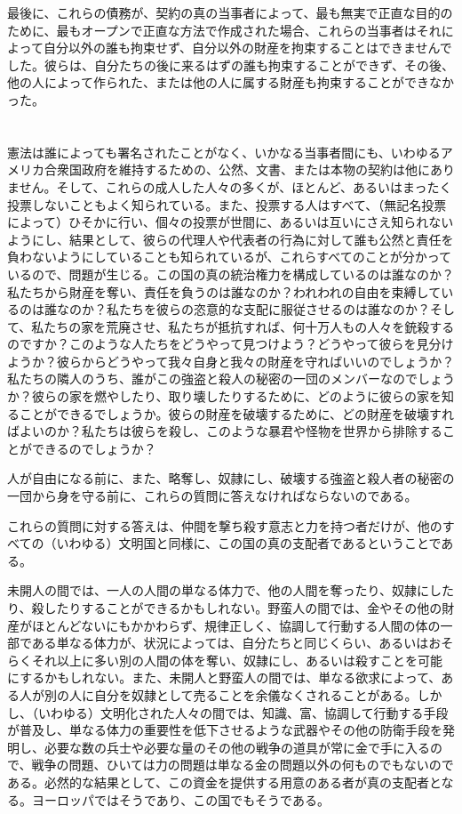 \documentclass[dvipdfmx, uplatex, tate, landscape]{utbook}
\begin{document}
最後に、これらの債務が、契約の真の当事者によって、最も無実で正直な目的のために、最もオープンで正直な方法で作成された場合、これらの当事者はそれによって自分以外の誰も拘束せず、自分以外の財産を拘束することはできませんでした。彼らは、自分たちの後に来るはずの誰も拘束することができず、その後、他の人によって作られた、または他の人に属する財産も拘束することができなかった。

\chapter{}

憲法は誰によっても署名されたことがなく、いかなる当事者間にも、いわゆるアメリカ合衆国政府を維持するための、公然、文書、または本物の契約は他にありません。そして、これらの成人した人々の多くが、ほとんど、あるいはまったく投票しないこともよく知られている。また、投票する人はすべて、（無記名投票によって）ひそかに行い、個々の投票が世間に、あるいは互いにさえ知られないようにし、結果として、彼らの代理人や代表者の行為に対して誰も公然と責任を負わないようにしていることも知られているが、これらすべてのことが分かっているので、問題が生じる。この国の真の統治権力を構成しているのは誰なのか？私たちから財産を奪い、責任を負うのは誰なのか？われわれの自由を束縛しているのは誰なのか？私たちを彼らの恣意的な支配に服従させるのは誰なのか？そして、私たちの家を荒廃させ、私たちが抵抗すれば、何十万人もの人々を銃殺するのですか？このような人たちをどうやって見つけよう？どうやって彼らを見分けようか？彼らからどうやって我々自身と我々の財産を守ればいいのでしょうか？私たちの隣人のうち、誰がこの強盗と殺人の秘密の一団のメンバーなのでしょうか？彼らの家を燃やしたり、取り壊したりするために、どのように彼らの家を知ることができるでしょうか。彼らの財産を破壊するために、どの財産を破壊すればよいのか？私たちは彼らを殺し、このような暴君や怪物を世界から排除することができるのでしょうか？

人が自由になる前に、また、略奪し、奴隷にし、破壊する強盗と殺人者の秘密の一団から身を守る前に、これらの質問に答えなければならないのである。

これらの質問に対する答えは、仲間を撃ち殺す意志と力を持つ者だけが、他のすべての（いわゆる）文明国と同様に、この国の真の支配者であるということである。

未開人の間では、一人の人間の単なる体力で、他の人間を奪ったり、奴隷にしたり、殺したりすることができるかもしれない。野蛮人の間では、金やその他の財産がほとんどないにもかかわらず、規律正しく、協調して行動する人間の体の一部である単なる体力が、状況によっては、自分たちと同じくらい、あるいはおそらくそれ以上に多い別の人間の体を奪い、奴隷にし、あるいは殺すことを可能にするかもしれない。また、未開人と野蛮人の間では、単なる欲求によって、ある人が別の人に自分を奴隷として売ることを余儀なくされることがある。しかし、（いわゆる）文明化された人々の間では、知識、富、協調して行動する手段が普及し、単なる体力の重要性を低下させるような武器やその他の防衛手段を発明し、必要な数の兵士や必要な量のその他の戦争の道具が常に金で手に入るので、戦争の問題、ひいては力の問題は単なる金の問題以外の何ものでもないのである。必然的な結果として、この資金を提供する用意のある者が真の支配者となる。ヨーロッパではそうであり、この国でもそうである。
\end{document}
